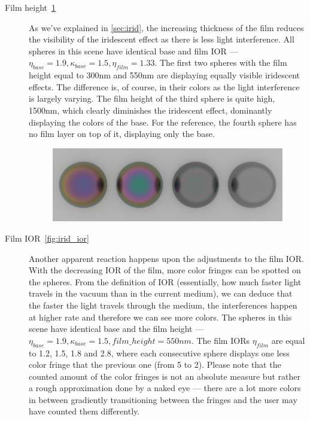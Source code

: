 \begin{description}
	\item[Film height~\ref{fig:irid_height}] As we've explained in \autoref{sec:irid}, the increasing thickness of the film reduces the visibility of the iridescent effect as there is less light interference. All spheres in this scene have identical base and film IOR --- $\eta_{base}=1.9, \kappa_{base}=1.5, \eta_{film}=1.33$. The first two spheres with the film height equal to 300nm and 550nm are displaying equally visible iridescent effects. The difference is, of course, in their colors as the light interference is largely varying. The film height of the third sphere is quite high, 1500nm, which clearly diminishes the iridescent effect, dominantly displaying the colors of the base. For the reference, the fourth sphere has no film layer on top of it, displaying only the base.
	\begin{figure}[H]
		\centering
		\includegraphics[width=.9\linewidth]{img/iridescent_spheres_height.png}
		\caption{}
		\label{fig:irid_height}
	\end{figure}
	\item[Film IOR~\ref{fig:irid_ior}] Another apparent reaction happens upon the adjustments to the film IOR. With the decreasing IOR of the film, more color fringes can be spotted on the spheres. From the definition of IOR (essentially, how much faster light travels in the vacuum than in the current medium), we can deduce that the faster the light travels through the medium, the interferences happen at higher rate and therefore we can see more colors. The spheres in this scene have identical base and the film height --- $\eta_{base}=1.9, \kappa_{base}=1.5, film\_height=550nm$. The film IORs $\eta_{film}$ are equal to 1.2, 1.5, 1.8 and 2.8, where each consecutive sphere displays one less color fringe that the previous one (from 5 to 2). Please note that the counted amount of the color fringes is not an absolute measure but rather a rough approximation done by a naked eye --- there are a lot more colors in between gradiently transitioning between the fringes and the user may have counted them differently.
	\begin{figure}[H]

\end{figure}
\end{description}

